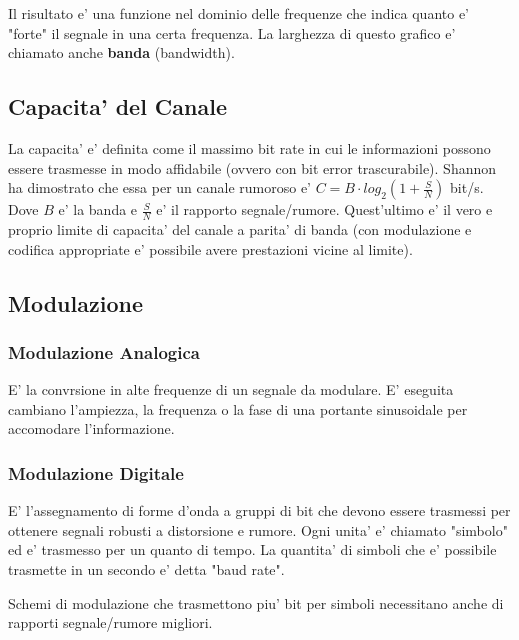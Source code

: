 
Il risultato e' una funzione nel dominio delle frequenze che indica quanto e' "forte" il segnale in una certa frequenza. La larghezza di questo grafico e' chiamato anche \textbf{banda} (bandwidth).


\subsection{Capacita' del Canale}

La capacita' e' definita come il massimo bit rate in cui le informazioni possono essere trasmesse in modo affidabile (ovvero con bit error trascurabile).
Shannon ha dimostrato che essa per un canale rumoroso e' $C = B \cdot log_2 (1 + \frac S N)$ bit/s. Dove $B$ e' la banda e $\frac S N$ e' il rapporto segnale/rumore.
Quest'ultimo e' il vero e proprio limite di capacita' del canale a parita' di banda (con modulazione e codifica appropriate e' possibile avere prestazioni vicine al limite).

\subsection{Modulazione}

\subsubsection{Modulazione Analogica}

E' la convrsione in alte frequenze di un segnale da modulare. E' eseguita cambiano l'ampiezza, la frequenza o la fase di una portante sinusoidale per accomodare l'informazione.


\subsubsection{Modulazione  Digitale}

E' l'assegnamento di forme d'onda a gruppi di bit che devono essere trasmessi per ottenere segnali robusti a distorsione e rumore.
Ogni unita' e' chiamato "simbolo" ed e' trasmesso per un quanto di tempo. La quantita' di simboli che e' possibile trasmette in un secondo e' detta "baud rate".

Schemi di modulazione che trasmettono piu' bit per simboli necessitano anche di rapporti segnale/rumore migliori.

